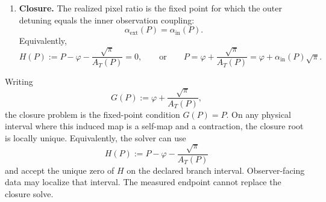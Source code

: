 \begin{enumerate}[leftmargin=2em]
hadronic spectral data and returns \(136.2636589431\) on
\([136.1583832834,136.3690975240]\). For either declared branch, define
\[
A_T(P):=
T_Q\bigl(A_Z(P),F_{D10}(P)\bigr)
=
\alpha_{\mathrm{Th}}^{-1}(P).
\]
The inner coupling used in the outer/inner closure is the coupling, not the inverse coupling:
\[
\alpha_{\mathrm{in}}(P):=\frac{1}{A_T(P)}.
\]
\item \textbf{Closure.} The realized pixel ratio is the fixed point for which the outer detuning
equals the inner observation coupling:
\[
\alpha_{\mathrm{ext}}(P)=\alpha_{\mathrm{in}}(P).
\]
Equivalently,
\[
H(P):=P-\varphi-\frac{\sqrt{\pi}}{A_T(P)}=0,
\qquad\text{or}\qquad
P=\varphi+\frac{\sqrt{\pi}}{A_T(P)}=\varphi+\alpha_{\mathrm{in}}(P)\sqrt{\pi}.
\]
\end{enumerate}
Writing
\[
G(P):=\varphi+\frac{\sqrt{\pi}}{A_T(P)},
\]
the closure problem is the fixed-point condition \(G(P)=P\).
On any physical interval where this induced map is a self-map and a contraction, the closure root
is locally unique.
Equivalently, the solver can use
\[
H(P):=P-\varphi-\frac{\sqrt{\pi}}{A_T(P)}
\]
and accept the unique zero of \(H\) on the declared branch interval. Observer-facing data may
localize that interval. The measured endpoint cannot replace the closure solve.

